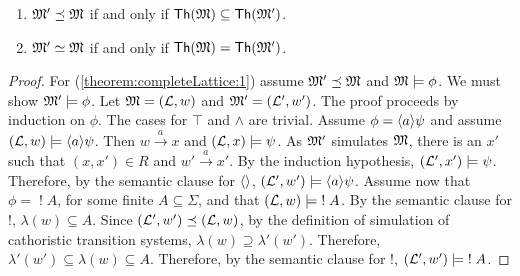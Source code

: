 

\begin{theorem}\label{theorem:completeLattice}
\begin{enumerate}

\item\label{theorem:completeLattice:1} $\frak{M}' \preceq \frak{M}$ if and
  only if $\mathsf{Th}(\frak{M}) \subseteq \mathsf{Th}(\frak{M}')$.

\item\label{theorem:completeLattice:2} $\frak{M}' \simeq \frak{M}$ if and
  only if $\mathsf{Th}(\frak{M}) = \mathsf{Th}(\frak{M}')$.

\end{enumerate}
\end{theorem}

\begin{proof}
For (\ref{theorem:completeLattice:1}) assume $\frak{M}' \preceq \frak{M}$
and $\frak{M} \models \phi$.  We must show $\frak{M}' \models \phi$.  Let
$\frak{M} = (\mathcal{L}, w)$ and $\frak{M}' = (\mathcal{L}', w')$.  The proof proceeds by
induction on $\phi$.  The cases for $\top$ and $\land$ are trivial.
Assume $\phi = \langle a \rangle \psi$ and assume $(\mathcal{L}, w) \models
\langle a \rangle \psi$.  Then $w \xrightarrow{a} x$ and $(\mathcal{L}, x) \models
\psi$.  As $\frak{M}'$ simulates $\frak{M}$, there is an $x'$ such that
$(x,x') \in R$ and $w' \xrightarrow{a} x'$.  By the induction
hypothesis, $(\mathcal{L}', x') \models \psi$.  Therefore, by the semantic
clause for $\MAY{}$, $(\mathcal{L}', w') \models \langle a \rangle \psi$.  Assume now
that $\phi = \; ! \; A$, for some finite $A \subseteq \Sigma$, and
that $(\mathcal{L}, w) \models \; ! \; A$.  By the semantic clause for $!$,
$\lambda(w) \subseteq A$.  Since $(\mathcal{L}', w') \preceq (\mathcal{L}, w)$, by
the definition of simulation of cathoristic transition systems, $\lambda(w)
\supseteq \lambda'(w')$.  Therefore, $\lambda'(w') \subseteq
\lambda(w) \subseteq A$.  Therefore, by the semantic clause for $!$,
$(\mathcal{L}', w') \models \; ! \; A$.


\end{proof}
